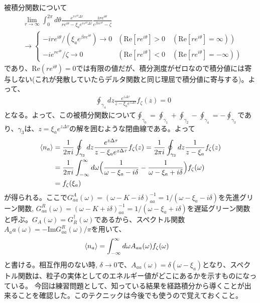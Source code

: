 \documentclass[a4paper,12pt]{jsarticle}
\begin{document}
被積分関数について
\begin{align}
    &\lim_{r\rightarrow\infty}\int_0^{2\pi} d\theta \frac{e^{r e^{i\theta}\Delta\tau}}{r e^{i\theta} - \xi_ae^{r e^{i\theta}\Delta\tau}} \frac{i r e^{i\theta}}{e^{\beta re^{i\theta}}-\zeta}\nonumber\\
    &\rightarrow \begin{cases}
      -ir e^{i\theta}/(\xi_ae^{\beta r e^{i\theta}}) \rightarrow 0 & (\mathrm{Re}[re^{i\theta}]>0\quad(\mathrm{Re}[re^{i\theta}] = \infty))\\
      -ie^{r e^{i\theta}}/\zeta\rightarrow0 & (\mathrm{Re}[re^{i\theta}]<0\quad(\mathrm{Re}[re^{i\theta}] = -\infty))
    \end{cases}
\end{align}
であり、$\mathrm{Re}(re^{i\theta})=0$では有限の値だが、積分測度がゼロなので積分値には寄与しない(これが発散していたらデルタ関数と同じ理屈で積分値に寄与する)。よって、
\begin{align}
  &\oint_{\gamma_4} dz \frac{e^{z\Delta\tau}}{z - \xi_ae^{z\Delta\tau}} f_{\zeta}(z) = 0
\end{align}
となる。よって、この被積分関数について$\oint_{\gamma_0} = \oint_{\gamma_1} + \oint_{\gamma_2} - \oint_{\gamma_4} = -\oint_{\gamma_3}$であり、$\gamma_3$は、$z = \xi_ae^{z\Delta\tau}$の解を囲むような閉曲線である。よって
\begin{align}
  \ev{n_a} &= \frac{1}{2\pi i}\oint_{\gamma_3} dz \frac{e^{z\Delta\tau}}{z - \xi_ae^{z\Delta\tau}} f_{\zeta}(z) = \frac{1}{2\pi i}\oint_{\gamma_3} dz \frac{1}{z - \xi_a} f_{\zeta}(z)\\
  &= \frac{1}{2\pi i}\int_{-\infty}^{\infty} d\omega \Bigl(\frac{1}{\omega - \xi_a -i\delta} - \frac{1}{\omega - \xi_a +i\delta}\Bigr) f_{\zeta}(\omega)\label{real_axis}\\
  &= f_{\zeta}(\xi_a)
\end{align}
が得られる。ここで$G^A_{aa}(\omega) = (\omega - K - i \delta)^{-1}_{aa}=  1/(\omega - \xi_a - i \delta)$を先進グリーン関数, $G^R_{aa}(\omega) = (\omega - K + i \delta)^{-1}_{aa} = 1/(\omega - \xi_a + i \delta)$を遅延グリーン関数と呼ぶ。$G_A(\omega) = G_R^{\dagger}(\omega)$であるから、スペクトル関数$A_aa(\omega) = -\mathrm{Im}G^R_{aa}(\omega)/\pi$を用いて、
\begin{align}
  \ev{n_a} &= \int_{-\infty}^{\infty} d\omega A_{aa}(\omega) f_{\zeta}(\omega)
\end{align}
と書ける。相互作用のない時, $\delta\rightarrow0$で、$A_{aa}(\omega) = \delta(\omega -\xi_a)$となり、スペクトル関数は、粒子の実体としてのエネルギー値がどこにあるかを示すものになっている。
今回は練習問題として、知っている結果を経路積分から導くことが出来ることを確認した。このテクニックは今後でも使うので覚えておくこと。
\end{document}
